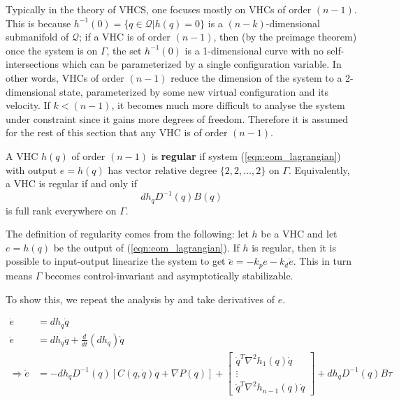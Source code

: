 Typically in the theory of VHCS, one focuses mostly on VHCs of order \((n-1)\).
This is because \(h^{-1}(0) = \{q \in \mathcal{Q} \vert h(q) = 0\}\) is a
\((n-k)\)-dimensional submanifold of \(\mathcal{Q}\); if a VHC is of order
\((n-1)\), then (by the preimage theorem) once the system is on \(\Gamma\), the
set \(h^{-1}(0)\) is a 1-dimensional curve with no self-intersections which can
be parameterized by a single configuration variable. In other words, VHCs of
order \((n-1)\) reduce the dimension of the system to a 2-dimensional state,
parameterized by some new virtual configuration and its velocity.  If \(k <
(n-1)\), it becomes much more difficult to analyse the system under constraint
since it gains more degrees of freedom. Therefore it is assumed for the rest of
this section that any VHC is of order \((n-1)\).

\begin{defn}\label{defn:vhc_regular}
   A VHC \(h(q)\) of order \((n-1)\) is \textbf{regular} if 
   system (\ref{eqn:eom_lagrangian}) with output \(e = h(q)\) has vector
   relative degree \(\{2,2,\ldots,2\}\) on \(\Gamma\).
   Equivalently, a VHC is regular if and only if 
   \[
      dh_q D^{-1}(q)B(q)
   \]
   is full rank everywhere on \(\Gamma\).
\end{defn}

The definition of regularity comes from the following: 
let \(h\) be a VHC and let \(e = h(q)\) be the
output of (\ref{eqn:eom_lagrangian}). If \(h\) is regular, then
it is possible to input-output
linearize the system to get \(\ddot{e} = -k_p e - k_d \dot{e}\). This
in turn means \(\Gamma\) becomes control-invariant and asymptotically
stabilizable.

To show this, we repeat the analysis by
\textcite{vhcs_for_el_systems,lagrangian_structure_reduced_dynamics_vhcs} and take
derivatives of \(e\).

\begin{align*}
   \dot{e} &= dh_q \dot{q} \\
   \ddot{e} &= dh_q \ddot{q} + \frac{d}{dt}\left(dh_q\right)\dot{q}\\
   \Rightarrow \ddot{e} &= 
      -dh_qD^{-1}(q)\left[C(q,\dot{q})\dot{q} + \nabla P(q) \right] 
      + \begin{bmatrix}
         \dot{q}^T \nabla^2 h_1(q) \dot{q} \\
         \vdots \\
         \dot{q}^T \nabla^2 h_{n-1}(q) \dot{q}
      \end{bmatrix}
      + dh_q D^{-1}(q)B\tau \\
\end{align*}

